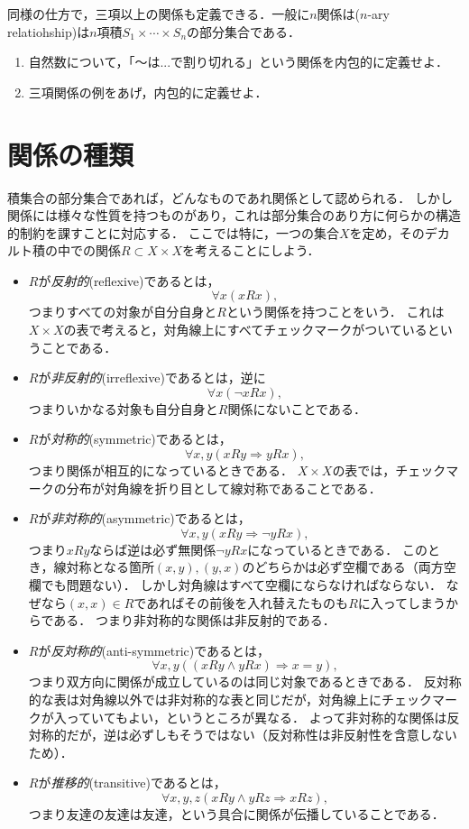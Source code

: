 \documentclass[11pt,a4paper]{jsarticle} %
\begin{document}
同様の仕方で，三項以上の関係も定義できる．一般に$n$関係は($n$-ary relatiohship)は$n$項積$S_1 \times \cdots \times S_n$の部分集合である．

\begin{exercise}
\begin{enumerate}
 \item 自然数について，「〜は...で割り切れる」という関係を内包的に定義せよ．
 \item 三項関係の例をあげ，内包的に定義せよ．
\end{enumerate}
\end{exercise}


\section{関係の種類}
\label{sec:relation_kinds}
積集合の部分集合であれば，どんなものであれ関係として認められる．
しかし関係には様々な性質を持つものがあり，これは部分集合のあり方に何らかの構造的制約を課すことに対応する．
ここでは特に，一つの集合$X$を定め，そのデカルト積の中での関係$R \subset X \times X$を考えることにしよう．

\begin{itemize}
 \item $R$が\emph{反射的}(reflexive)であるとは，
       \[ \forall x ( xRx ), \]
       つまりすべての対象が自分自身と$R$という関係を持つことをいう．
       これは$X \times X$の表で考えると，対角線上にすべてチェックマークがついているということである．
 \item $R$が\emph{非反射的}(irreflexive)であるとは，逆に
       \[ \forall x ( \neg xRx ), \]
       つまりいかなる対象も自分自身と$R$関係にないことである．
 \item $R$が\emph{対称的}(symmetric)であるとは，
       \[ \forall x, y ( xRy \Rightarrow yRx ), \]
       つまり関係が相互的になっているときである．
       $X \times X$の表では，チェックマークの分布が対角線を折り目として線対称であることである．
 \item $R$が\emph{非対称的}(asymmetric)であるとは，
       \[  \forall x, y ( xRy \Rightarrow \neg yRx ), \]
       つまり$xRy$ならば逆は必ず無関係$\neg yRx$になっているときである．
       このとき，線対称となる箇所$(x,y), (y,x)$のどちらかは必ず空欄である（両方空欄でも問題ない）．
       しかし対角線はすべて空欄にならなければならない．
       なぜなら$(x,x) \in R$であればその前後を入れ替えたものも$R$に入ってしまうからである．
       つまり非対称的な関係は非反射的である．
 \item $R$が\emph{反対称的}(anti-symmetric)であるとは，
       \[ \forall x, y (( xRy \wedge yRx)  \Rightarrow x=y), \]
       つまり双方向に関係が成立しているのは同じ対象であるときである．
       反対称的な表は対角線以外では非対称的な表と同じだが，対角線上にチェックマークが入っていてもよい，というところが異なる．
       よって非対称的な関係は反対称的だが，逆は必ずしもそうではない（反対称性は非反射性を含意しないため）．
 \item $R$が\emph{推移的}(transitive)であるとは，
       \[ \forall x, y, z  ( xRy \wedge yRz \Rightarrow xRz), \]
       つまり友達の友達は友達，という具合に関係が伝播していることである．
\end{itemize}
\end{document}
